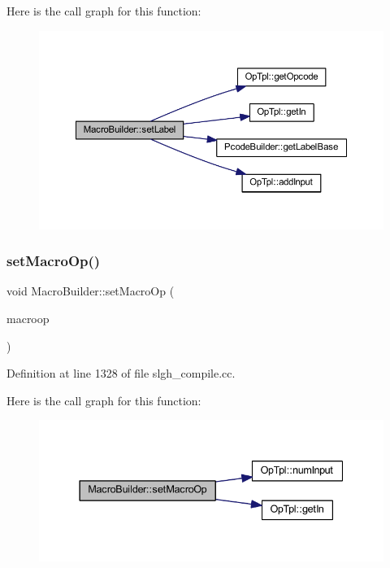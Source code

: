 Here is the call graph for this function\+:
\nopagebreak
\begin{figure}[H]
\begin{center}
\leavevmode
\includegraphics[width=350pt]{class_macro_builder_a5ea6a3fd6be762cc3d05851e59b22b79_cgraph}
\end{center}
\end{figure}
\mbox{\label{class_macro_builder_a394a95a6f96e016453a33734f132ae59}} 
\subsubsection{\texorpdfstring{setMacroOp()}{setMacroOp()}}
{\footnotesize\ttfamily void Macro\+Builder\+::set\+Macro\+Op (\begin{DoxyParamCaption}\item[{\mbox{\hyperlink{class_op_tpl}{Op\+Tpl}} $\ast$}]{macroop }\end{DoxyParamCaption})}



Definition at line 1328 of file slgh\+\_\+compile.\+cc.

Here is the call graph for this function\+:
\nopagebreak
\begin{figure}[H]
\begin{center}
\leavevmode
\includegraphics[width=337pt]{class_macro_builder_a394a95a6f96e016453a33734f132ae59_cgraph}
\end{center}
\end{figure}


